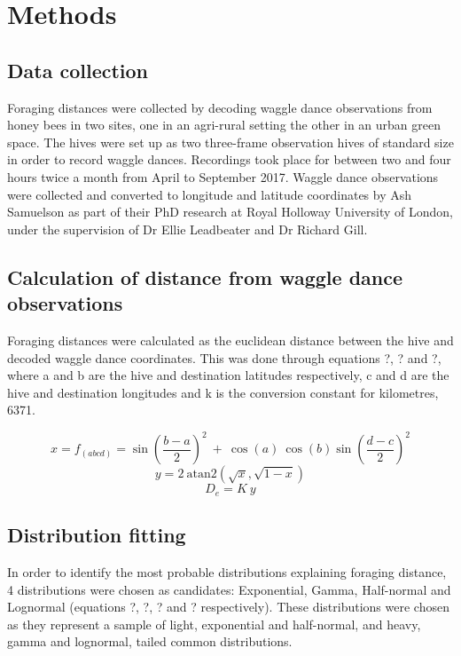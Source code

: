 \documentclass[11pt,usenames,dvipsnames]{article}
\begin{document}
\section{Methods}

\subsection{Data collection}
Foraging distances were collected by decoding waggle dance observations from honey bees in two sites, one in an agri-rural setting the other in an urban green space. The hives were set up as two three-frame observation hives of standard size in order to record waggle dances. Recordings took place for between two and four hours twice a month from April to September 2017. Waggle dance observations were collected and converted to longitude and latitude coordinates by Ash Samuelson as part of their PhD research at Royal Holloway University of London, under the supervision of Dr Ellie Leadbeater and Dr Richard Gill.

\subsection{Calculation of distance from waggle dance observations}
Foraging distances were calculated as the euclidean distance between the hive and decoded waggle dance coordinates. This was done through equations ?, ? and ?, where a and b are the hive and destination latitudes respectively, c and d are the hive and destination longitudes and k is the conversion constant for kilometres, 6371.

\begin{equation}
x = f_{(abcd)} = \sin\left(\frac{b - a}{2}\right)^2\ +\ \cos(a)\ \cos(b) \sin\left(\frac{d - c}{2}\right)^2 
\end{equation}
\begin{equation}
y = 2\ \text{atan2}(\sqrt{x}, \sqrt{1 - x})
\end{equation}
\begin{equation}
D_e = K\ y
\end{equation}

\subsection{Distribution fitting}

In order to identify the most probable distributions explaining foraging distance, 4 distributions were chosen as candidates: Exponential, Gamma, Half-normal and Lognormal (equations ?, ?, ? and ? respectively). These distributions were chosen as they represent a sample of light, exponential and half-normal, and heavy, gamma and lognormal, tailed common distributions.
\end{document}
